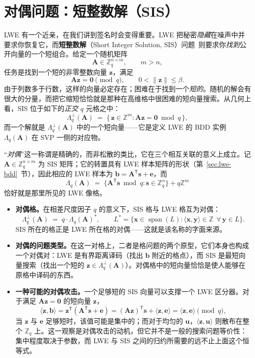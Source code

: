 \section{对偶问题：短整数解（SIS）}
\label{sec:sis}

LWE 有一个近亲，在我们讲到签名时会变得重要。LWE 把秘密\emph{隐藏}在噪声中并要求你恢复它，而\textbf{短整数解}（Short Integer Solution, SIS）问题~\cite{ajtai1996}则要求你\emph{找到}公开向量的一个短组合。给定一个随机矩阵
\[
\mathbf{A} \in \mathbb{Z}_q^{n \times m}, \qquad m > n,
\]
任务是找到一个短的非零整数向量 $\mathbf{z}$，满足
\[
\mathbf{A}\mathbf{z} = \mathbf{0} \pmod q, \qquad 0 < \|\mathbf{z}\| \le \beta.
\]
由于列数多于行数，这样的向量必定存在；困难在于找到一个\emph{短的}。随机的解会有很大的分量，而把它缩短恰恰就是那种在高维格中很困难的短向量搜索。从几何上看，SIS 位于如下的\emph{正交} $q$ 元格之中：
\[
\Lambda_q^{\perp}(\mathbf{A}) \;=\; \{\, \mathbf{z}\in\mathbb{Z}^{m} : \mathbf{A}\mathbf{z}=\mathbf{0}\bmod q \,\},
\]
而一个解就是 $\Lambda_q^{\perp}(\mathbf{A})$ 中的一个短向量——它是定义 LWE 的 BDD 实例 $\Lambda_q(\mathbf{A})$ 在 SVP 一侧的对应物。

“\emph{对偶}”这一称谓是精确的，而非松散的类比，它在三个相互关联的意义上成立。记 $\mathbf{A}\in\mathbb{Z}_q^{n\times m}$ 为 SIS 矩阵；它的转置具有 LWE 样本矩阵的形状（第~\ref{sec:lwe-bdd}~节），因此相应的 LWE 样本为 $\mathbf{b}=\mathbf{A}^{\mathsf T}\mathbf{s}+\mathbf{e}$，而
\[
\Lambda_q(\mathbf{A}) \;=\; \{\mathbf{A}^{\mathsf T}\mathbf{s}\bmod q : \mathbf{s}\in\mathbb{Z}_q^{n}\}+q\mathbb{Z}^{m}
\]
恰好就是那里所见的 LWE 像格。

\begin{itemize}
  \item \textbf{对偶格。}在相差尺度因子 $q$ 的意义下，SIS 格与 LWE 格互为对偶：
  \[
  \Lambda_q^{\perp}(\mathbf{A}) \;=\; q\cdot\Lambda_q(\mathbf{A})^{*},
  \qquad
  L^{*}=\{\mathbf{x}\in\operatorname{span}(L):\langle\mathbf{x},\mathbf{y}\rangle\in\mathbb{Z}\ \ \forall\,\mathbf{y}\in L\}.
  \]
  SIS 所在的格正是 LWE 所在格的对偶——这就是该名称的字面来源。
  \item \textbf{对偶的问题类型。}在这一对格上，二者是格问题的两个原型，它们本身也构成一个对偶对：LWE 是有界距离译码（找出 $\mathbf{b}$ 附近的格点），而 SIS 是最短向量搜索（找出一个短的 $\mathbf{z}\in\Lambda_q^{\perp}(\mathbf{A})$）。对偶格中的短向量恰恰是使人能够在原格中译码的东西。
  \item \textbf{一种可能的对偶攻击。}一个足够短的 SIS 向量可以支撑一个 LWE 区分器。对于满足 $\mathbf{A}\mathbf{z}=\mathbf{0}$ 的短向量 $\mathbf{z}$，
  \[
  \langle \mathbf{z},\mathbf{b}\rangle
  = \mathbf{z}^{\mathsf T}\!\left(\mathbf{A}^{\mathsf T}\mathbf{s}+\mathbf{e}\right)
  = (\mathbf{A}\mathbf{z})^{\mathsf T}\mathbf{s} + \langle \mathbf{z},\mathbf{e}\rangle
  = \langle \mathbf{z},\mathbf{e}\rangle \pmod q,
  \]
  当 $\mathbf{z}$ 与 $\mathbf{e}$ 足够短时，该值可能是集中的；而对于均匀的 $\mathbf{u}$，$\langle\mathbf{z},\mathbf{u}\rangle$ 则散布在整个 $\mathbb{Z}_q$ 上。这一观察是对偶攻击的动机，但它并不是一般的搜索问题等价性：集中程度取决于参数，而 LWE 与 SIS 之间的归约所需要的远不止上面这个恒等式。
\end{itemize}

